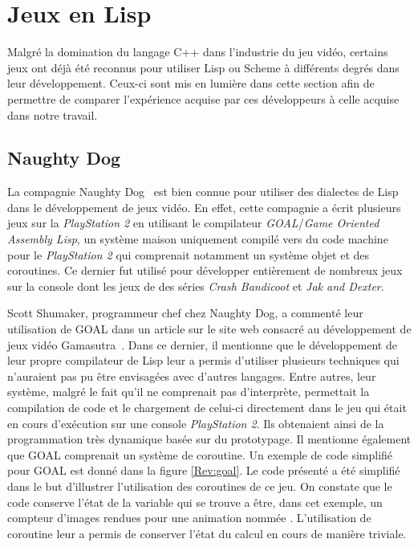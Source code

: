 \documentclass[12pt,twoside,letterpaper,francais]{book}
\newcommand{\scheme}[1]{\selectlanguage{english}{\tt #1}\selectlanguage{french}}
\begin{document}
\FloatBarrier
\section{Jeux en Lisp}
Malgré la domination du langage C++ dans l'industrie du jeu vidéo,
certains jeux ont déjà été reconnus pour utiliser Lisp ou Scheme à
différents degrés dans leur dévelop\-pement. Ceux-ci sont mis en lumière
dans cette section afin de permettre de comparer l'expérience acquise
par ces développeurs à celle acquise dans notre travail.


\FloatBarrier
\subsection{Naughty Dog}
La compagnie Naughty Dog~\cite{ND} est bien connue pour utiliser des
dialectes de Lisp dans le dévelop\-pement de jeux vidéo. En effet,
cette compagnie a écrit plusieurs jeux sur la \textit{PlayStation 2}
en utilisant le compilateur \textit{GOAL}/\textit{Game Oriented
  Assembly Lisp}, un système maison uniquement compilé vers du code
machine pour le \textit{PlayStation 2} qui comprenait notamment un
système objet et des coroutines. Ce dernier fut utilisé pour
développer entièrement de nombreux jeux sur la console dont les jeux
de des séries \textit{Crash Bandicoot} et \textit{Jak and Dexter}.

Scott Shumaker, programmeur chef chez Naughty Dog, a commenté leur
utilisation de GOAL dans un article sur le site web consacré au
dévelop\-pement de jeux vidéo Gamasutra~\cite{ND_GOAL}. Dans ce dernier,
il mentionne que le dévelop\-pement de leur propre compilateur de Lisp
leur a permis d'utiliser plusieurs techniques qui n'auraient pas pu
être envisagées avec d'autres langages. Entre autres, leur système,
malgré le fait qu'il ne comprenait pas d'interprète, permettait la
compilation de code et le chargement de celui-ci directement dans le
jeu qui était en cours d'exécution sur une console \textit{PlayStation
  2}. Ils obtenaient ainsi de la programmation très dynamique basée
sur du prototypage. Il mentionne également que GOAL comprenait un
système de coroutine. Un exemple de code simplifié pour GOAL est donné
dans la figure \ref{Rev:goal}. Le code présenté a été simplifié dans
le but d'illustrer l'utilisation des coroutines de ce jeu. On constate
que le code conserve l'état de la variable \scheme{ii} qui se trouve a
être, dans cet exemple, un compteur d'images rendues pour une
animation nommée \scheme{idle}. L'utilisation de coroutine leur a
permis de conserver l'état du calcul en cours de manière triviale.\\
\end{document}
